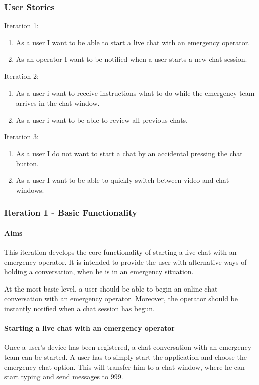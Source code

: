 \documentclass{article}
\begin{document}
		\subsubsection{User Stories}
		Iteration 1:
		\begin{enumerate}
		
\item As a user I want to be able to start a live chat with an emergency operator.
\item As an operator I want to be notified when a user starts a new chat session.
\end{enumerate}
Iteration 2:
\begin{enumerate}

\item As a user i want to receive instructions what to do while the emergency team arrives in the chat window. 
\item As a user i want to be able to review all previous chats.

\end{enumerate}
Iteration 3:
\begin{enumerate}

\item As a user I do not want to start a chat by an accidental pressing the chat button.
\item As a user I want to be able to quickly switch between video and chat windows.

\end{enumerate}
		
		\pagebreak
		\subsubsection{Iteration 1 - Basic Functionality}
			\paragraph{Aims}
			This iteration develops the core functionality of starting a live chat with an emergency operator. It is intended to provide the user with alternative ways of holding a conversation, when he is in an emergency situation.

At the most basic level, a user should be able to begin an online chat conversation with an emergency operator. Moreover, the operator should be instantly notified when a chat session has begun. 

		\paragraph{Starting a live chat with an emergency operator}
		Once a user’s device has been registered, a chat conversation with an emergency team can be started. A user has to simply start the application and choose the emergency chat option. This will transfer him to a chat window, where he can start typing and send messages to 999. 
\end{document}
